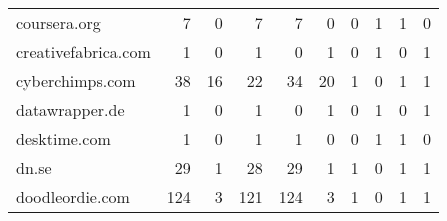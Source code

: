 \begin{tabular}{lrrrrrrrrr}
               coursera.org &                                7 &                                  0 &                                      7 &                            7 &                           0 &                                   0 &                                      1 &                             1 &                            0 \\
        creativefabrica.com &                                1 &                                  0 &                                      1 &                            0 &                           1 &                                   0 &                                      1 &                             0 &                            1 \\
            cyberchimps.com &                               38 &                                 16 &                                     22 &                           34 &                          20 &                                   1 &                                      0 &                             1 &                            1 \\
             datawrapper.de &                                1 &                                  0 &                                      1 &                            0 &                           1 &                                   0 &                                      1 &                             0 &                            1 \\
               desktime.com &                                1 &                                  0 &                                      1 &                            1 &                           0 &                                   0 &                                      1 &                             1 &                            0 \\
                      dn.se &                               29 &                                  1 &                                     28 &                           29 &                           1 &                                   1 &                                      0 &                             1 &                            1 \\
            doodleordie.com &                              124 &                                  3 &                                    121 &                          124 &                           3 &                                   1 &                                      0 &                             1 &                            1 \\

\end{tabular}
